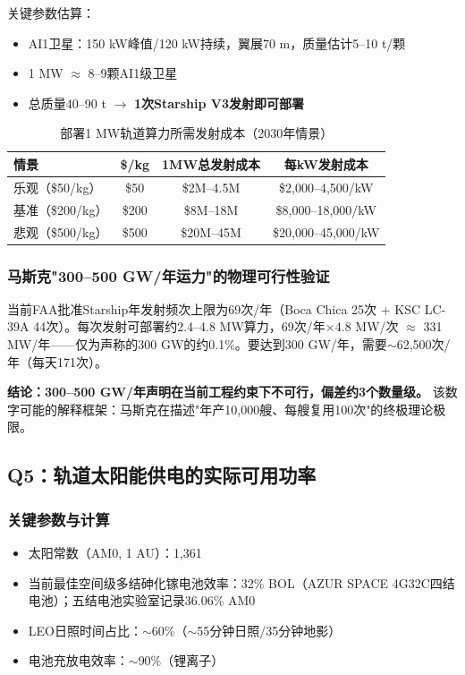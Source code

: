 关键参数估算：
\begin{itemize}[leftmargin=*]
    \item AI1卫星：150 kW峰值/120 kW持续，翼展70 m，质量估计5--10 t/颗
    \item 1 MW $\approx$ 8--9颗AI1级卫星
    \item 总质量40--90 t $\rightarrow$ \textbf{1次Starship V3发射即可部署}
\end{itemize}

\begin{table}[H]
\centering
\caption{部署1 MW轨道算力所需发射成本（2030年情景）}
\label{tab:launch_1mw}
\begin{tabular}{lccc}
\toprule
\textbf{情景} & \textbf{\$/kg} & \textbf{1MW总发射成本} & \textbf{每kW发射成本} \\
\midrule
乐观（\$50/kg） & \$50 & \$2M--4.5M & \$2,000--4,500/kW \\
基准（\$200/kg） & \$200 & \$8M--18M & \$8,000--18,000/kW \\
悲观（\$500/kg） & \$500 & \$20M--45M & \$20,000--45,000/kW \\
\bottomrule
\end{tabular}
\end{table}

\subsubsection{马斯克"300--500 GW/年运力"的物理可行性验证}

当前FAA批准Starship年发射频次上限为69次/年（Boca Chica 25次 + KSC LC-39A 44次）\cite{faa2025boca,faa2026ksc}。每次发射可部署约2.4--4.8 MW算力，69次/年$\times$4.8 MW/次 $\approx$ 331 MW/年——仅为声称的300 GW的约0.1\%。要达到300 GW/年，需要$\sim$62,500次/年（每天171次）。

\textbf{结论：300--500 GW/年声明在当前工程约束下不可行，偏差约3个数量级。} 该数字可能的解释框架：马斯克在描述"年产10,000艘、每艘复用100次"的终极理论极限\cite{33fg2026starship}。

\subsection{Q5：轨道太阳能供电的实际可用功率}

\subsubsection{关键参数与计算}

\begin{itemize}[leftmargin=*]
    \item 太阳常数（AM0, 1 AU）：1,361\unitWpm{}
    \item 当前最佳空间级多结砷化镓电池效率：32\% BOL（AZUR SPACE 4G32C四结电池）；五结电池实验室记录36.06\% AM0\cite{azur2025space,zhang2025solar}
    \item LEO日照时间占比：$\sim$60\%（$\sim$55分钟日照/35分钟地影）
    \item 电池充放电效率：$\sim$90\%（锂离子）
\end{itemize}

